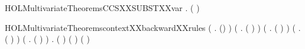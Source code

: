 \newcommand{\HOLMultivariateTheoremsCCSXXSUBSTXXsum}{\UseVerbatim{HOLMultivariateTheoremsCCSXXSUBSTXXsum}}
\begin{SaveVerbatim}{HOLMultivariateTheoremsCCSXXSUBSTXXvar}
\HOLTokenTurnstile{} \HOLSymConst{\HOLTokenForall{}} .
         ( ) \HOLSymConst{=}
         \HOLConst{\HOLTokenIn{}}         
\end{SaveVerbatim}
\newcommand{\HOLMultivariateTheoremsCCSXXSUBSTXXvar}{\UseVerbatim{HOLMultivariateTheoremsCCSXXSUBSTXXvar}}
\begin{SaveVerbatim}{HOLMultivariateTheoremscontextXXbackwardXXrules}
\HOLTokenTurnstile{} (\HOLSymConst{\HOLTokenForall{}}  .   () \HOLSymConst{\HOLTokenImp{}}   ) \HOLSymConst{\HOLTokenConj{}}
   (\HOLSymConst{\HOLTokenForall{}}  .
          ( \HOLSymConst{\ensuremath{+}} ) \HOLSymConst{\HOLTokenImp{}}    \HOLSymConst{\HOLTokenConj{}}   ) \HOLSymConst{\HOLTokenConj{}}
   (\HOLSymConst{\HOLTokenForall{}}  .
          ( \HOLSymConst{\ensuremath{\parallel}} ) \HOLSymConst{\HOLTokenImp{}}    \HOLSymConst{\HOLTokenConj{}}   ) \HOLSymConst{\HOLTokenConj{}}
   (\HOLSymConst{\HOLTokenForall{}}  .   (\HOLConst{\ensuremath{\nu}}  ) \HOLSymConst{\HOLTokenImp{}}   ) \HOLSymConst{\HOLTokenConj{}}
   (\HOLSymConst{\HOLTokenForall{}}  .   (  ) \HOLSymConst{\HOLTokenImp{}}   ) \HOLSymConst{\HOLTokenConj{}}
   \HOLSymConst{\HOLTokenForall{}}  .
         (  ) \HOLSymConst{\HOLTokenImp{}}
          \HOLSymConst{\HOLTokenConj{}}  ( ) ( )
\end{SaveVerbatim}
